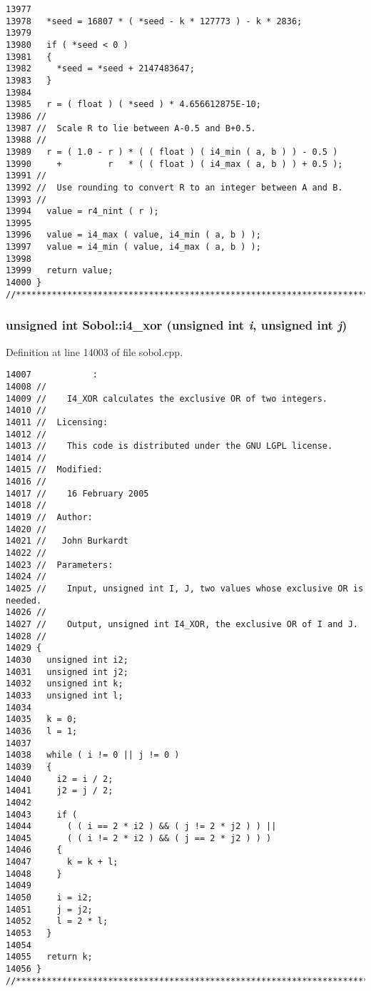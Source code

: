 \begin{Code}
\begin{verbatim}
13977 
13978   *seed = 16807 * ( *seed - k * 127773 ) - k * 2836;
13979 
13980   if ( *seed < 0 )
13981   {
13982     *seed = *seed + 2147483647;
13983   }
13984 
13985   r = ( float ) ( *seed ) * 4.656612875E-10;
13986 //
13987 //  Scale R to lie between A-0.5 and B+0.5.
13988 //
13989   r = ( 1.0 - r ) * ( ( float ) ( i4_min ( a, b ) ) - 0.5 ) 
13990     +         r   * ( ( float ) ( i4_max ( a, b ) ) + 0.5 );
13991 //
13992 //  Use rounding to convert R to an integer between A and B.
13993 //
13994   value = r4_nint ( r );
13995 
13996   value = i4_max ( value, i4_min ( a, b ) );
13997   value = i4_min ( value, i4_max ( a, b ) );
13998 
13999   return value;
14000 }
//****************************************************************************80
\end{verbatim}
\end{Code}


\subsubsection{\setlength{\rightskip}{0pt plus 5cm}unsigned int Sobol::i4\_\-xor (unsigned int {\em i}, unsigned int {\em j})}\label{namespaceSobol_5c11d2ad4db4d8e710cb9b98d6e72b68}




Definition at line 14003 of file sobol.cpp.

\begin{Code}\begin{verbatim}14007            :
14008 //
14009 //    I4_XOR calculates the exclusive OR of two integers.
14010 //
14011 //  Licensing:
14012 //
14013 //    This code is distributed under the GNU LGPL license. 
14014 //
14015 //  Modified:
14016 //
14017 //    16 February 2005
14018 //
14019 //  Author:
14020 //
14021 //   John Burkardt
14022 //
14023 //  Parameters:
14024 //
14025 //    Input, unsigned int I, J, two values whose exclusive OR is needed.
14026 //
14027 //    Output, unsigned int I4_XOR, the exclusive OR of I and J.
14028 //
14029 {
14030   unsigned int i2;
14031   unsigned int j2;
14032   unsigned int k;
14033   unsigned int l;
14034 
14035   k = 0;
14036   l = 1;
14037 
14038   while ( i != 0 || j != 0 )
14039   {
14040     i2 = i / 2;
14041     j2 = j / 2;
14042 
14043     if ( 
14044       ( ( i == 2 * i2 ) && ( j != 2 * j2 ) ) ||
14045       ( ( i != 2 * i2 ) && ( j == 2 * j2 ) ) )
14046     {
14047       k = k + l;
14048     }
14049 
14050     i = i2;
14051     j = j2;
14052     l = 2 * l;
14053   }
14054 
14055   return k;
14056 }
//****************************************************************************80
\end{verbatim}
\end{Code}



